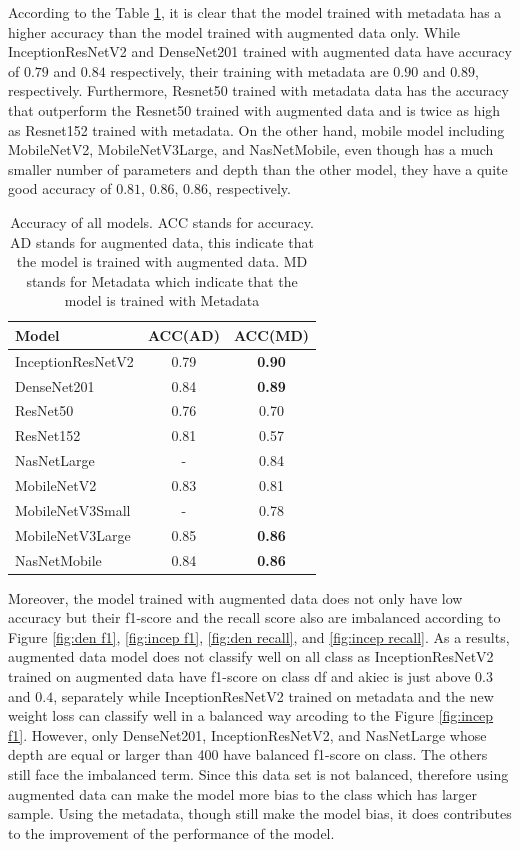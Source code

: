 \documentclass[sensors,article,submit,pdftex,moreauthors]{Definitions/mdpi}
\begin{document}
According to the Table \ref{table:overall-acc}, it is clear that the model trained with metadata has a higher accuracy than the model trained with augmented data only. While InceptionResNetV2 and DenseNet201 trained with augmented data have accuracy of $0.79$ and $0.84$ respectively, their training with metadata are $0.90$ and $0.89$, respectively. Furthermore, Resnet50 trained with metadata data has the accuracy that outperform the Resnet50 trained with augmented data and is twice as high as Resnet152 trained with metadata. On the other hand, mobile model including MobileNetV2, MobileNetV3Large, and NasNetMobile, even though has a much smaller number of parameters and depth than the other model, they have a quite good accuracy of $0.81$, $0.86$, $0.86$, respectively. 

\begin{table}[H]
	\centering
	\begin{tabular}{| l | c  c | }
		\hline
		Model & ACC(AD) & ACC(MD)\\ 
		\hline
		InceptionResNetV2 & 0.79 & \textbf{0.90}\\
		\hline
		DenseNet201 & 0.84 & \textbf{0.89}\\
		\hline
		ResNet50 & 0.76 & 0.70\\
		\hline
		ResNet152 & 0.81 & 0.57\\
		\hline
		NasNetLarge & - & 0.84\\
		\hline
		MobileNetV2 & 0.83 & 0.81\\
		\hline
		MobileNetV3Small & - & 0.78\\
		\hline
		MobileNetV3Large & 0.85 & \textbf{0.86}\\
		\hline
		NasNetMobile & 0.84 & \textbf{0.86}\\
		\hline
	\end{tabular}
	\caption{Accuracy of all models. ACC stands for accuracy. AD stands for augmented data, this indicate that the model is trained with augmented data. MD stands for Metadata which indicate that the model is trained with Metadata}
	\label{table:overall-acc}
\end{table}

Moreover, the model trained with augmented data does not only have low accuracy but their f1-score and the recall score also are imbalanced according to Figure \ref{fig:den f1}, \ref{fig:incep f1}, \ref{fig:den recall}, and \ref{fig:incep recall}. As a results, augmented data model does not classify well on all class as InceptionResNetV2 trained on augmented data have f1-score on class df and akiec is just above $0.3$ and $0.4$, separately while InceptionResNetV2 trained on metadata and the new weight loss can classify well in a balanced way arcoding to the Figure \ref{fig:incep f1}. However, only DenseNet201, InceptionResNetV2, and NasNetLarge whose depth are equal or larger than 400 have balanced f1-score on class. The others still face the imbalanced term. Since this data set is not balanced, therefore using augmented data can make the model more  bias to the class which has larger sample. Using the metadata, though still make the model bias, it does contributes to the improvement of  the performance of the model.
\end{document}
